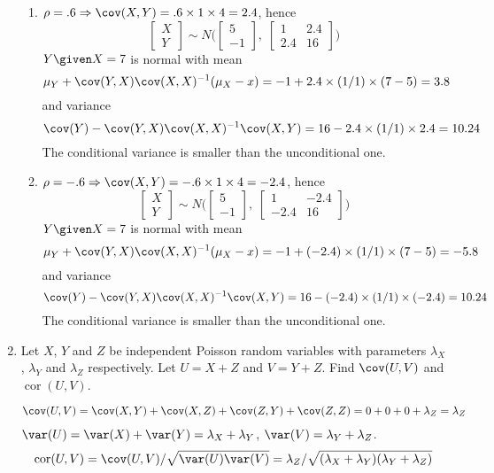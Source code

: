 \documentclass[12pt]{article}
\begin{document}
\begin{enumerate}
\begin{enumerate}
\item
$\rho = .6 \Rightarrow \cov(X,Y) = .6 \times 1 \times 4 = 2.4$, hence
\[
\begin{bmatrix}X\\ Y\end{bmatrix}
\sim N\biggl(
    \begin{bmatrix}5\\ -1\end{bmatrix},\;
    \begin{bmatrix}1 & 2.4\\ 2.4 & 16\end{bmatrix}
    \biggr)
\]
$Y \given X = 7$ is normal with mean
\[
\mu_Y + \cov(Y,X) \cov(X,X)^{-1} (\mu_X - x)
= -1 + 2.4 \times (1/1) \times (7 - 5)
= 3.8
\]
and variance
\[
\cov(Y) - \cov(Y,X) \cov(X,X)^{-1} \cov(X,Y)
= 16 - 2.4 \times (1/1) \times 2.4
= 10.24
\]
The conditional variance is smaller than the unconditional one.

\item
$\rho = -.6 \Rightarrow \cov(X,Y) = -.6 \times 1 \times 4 = -2.4$, hence
\[
\begin{bmatrix}X\\ Y\end{bmatrix}
\sim N\biggl(
    \begin{bmatrix}5\\ -1\end{bmatrix},\;
    \begin{bmatrix}1 & -2.4\\ -2.4 & 16\end{bmatrix}
    \biggr)
\]
$Y \given X = 7$ is normal with mean
\[
\mu_Y + \cov(Y,X) \cov(X,X)^{-1} (\mu_X - x)
= -1 + (-2.4) \times (1/1) \times (7 - 5)
= -5.8
\]
and variance
\[
\cov(Y) - \cov(Y,X) \cov(X,X)^{-1} \cov(X,Y)
= 16 - (-2.4) \times (1/1) \times (-2.4)
= 10.24
\]
The conditional variance is smaller than the unconditional one.
\end{enumerate}

\item Let $X$, $Y$ and $Z$ be independent Poisson random variables with parameters
$\lambda_X$, $\lambda_Y$ and $\lambda_Z$ respectively. Let $U = X+Z$ and $V = Y+Z$.
Find $\cov(U,V)$ and $\operatorname{cor}(U,V)$.

\hrulefill

\[
\cov(U,V)
= \cov(X,Y) + \cov(X,Z) + \cov(Z,Y) + \cov(Z,Z)
= 0 + 0 + 0 + \lambda_Z
= \lambda_Z
\]
$\var(U) = \var(X) + \var(Y) = \lambda_X + \lambda_Y$,
$\var(V) = \lambda_Y + \lambda_Z$.
\[
\operatorname{cor}(U,V)
= \cov(U,V) / \sqrt{\var(U)\var(V)}
= \lambda_Z / \sqrt{(\lambda_X + \lambda_Y)(\lambda_Y + \lambda_Z)}
\]


\end{enumerate}
\end{document}
